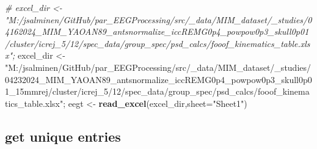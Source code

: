 \documentclass[
]{article}
\newenvironment{Shaded}{\begin{snugshade}}{\end{snugshade}}
\newcommand{\AttributeTok}[1]{\textcolor[rgb]{0.13,0.29,0.53}{#1}}
\newcommand{\CommentTok}[1]{\textcolor[rgb]{0.56,0.35,0.01}{\textit{#1}}}
\newcommand{\FunctionTok}[1]{\textcolor[rgb]{0.13,0.29,0.53}{\textbf{#1}}}
\newcommand{\NormalTok}[1]{#1}
\newcommand{\OtherTok}[1]{\textcolor[rgb]{0.56,0.35,0.01}{#1}}
\newcommand{\SpecialCharTok}[1]{\textcolor[rgb]{0.81,0.36,0.00}{\textbf{#1}}}
\newcommand{\StringTok}[1]{\textcolor[rgb]{0.31,0.60,0.02}{#1}}
\begin{document}
\begin{Shaded}
\begin{Highlighting}[]
\CommentTok{\# excel\_dir \textless{}{-}"M:/jsalminen/GitHub/par\_EEGProcessing/src/\_data/MIM\_dataset/\_studies/04162024\_MIM\_YAOAN89\_antsnormalize\_iccREMG0p4\_powpow0p3\_skull0p01/cluster/icrej\_5/12/spec\_data/group\_spec/psd\_calcs/fooof\_kinematics\_table.xlsx";}
\NormalTok{excel\_dir }\OtherTok{\textless{}{-}}\StringTok{"M:/jsalminen/GitHub/par\_EEGProcessing/src/\_data/MIM\_dataset/\_studies/04232024\_MIM\_YAOAN89\_antsnormalize\_iccREMG0p4\_powpow0p3\_skull0p01\_15mmrej/cluster/icrej\_5/12/spec\_data/group\_spec/psd\_calcs/fooof\_kinematics\_table.xlsx"}\NormalTok{;}
\NormalTok{eegt }\OtherTok{\textless{}{-}} \FunctionTok{read\_excel}\NormalTok{(excel\_dir,}\AttributeTok{sheet=}\StringTok{"Sheet1"}\NormalTok{) }
\end{Highlighting}
\end{Shaded}

\hypertarget{get-unique-entries}{%
\subsection{get unique entries}\label{get-unique-entries}}

\begin{Shaded}
\end{Shaded}
\end{document}
